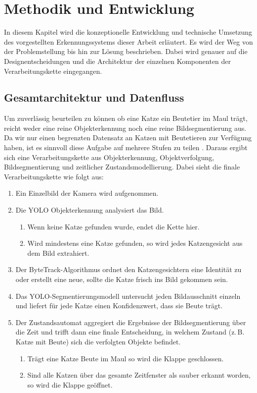 \chapter{Methodik und Entwicklung}
\label{sec:methodik}

In diesem Kapitel wird die konzeptionelle Entwicklung und technische Umsetzung des vorgestellten Erkennungssystems dieser Arbeit erläutert. Es wird der Weg von der Problemstellung bis hin zur Lösung beschrieben. Dabei wird genauer auf die Designentscheidungen und die Architektur der einzelnen Komponenten der Verarbeitungskette eingegangen.

\section{Gesamtarchitektur und Datenfluss}
Um zuverlässig beurteilen zu können ob eine Katze ein Beutetier im Maul trägt, reicht weder eine reine Objekterkennung noch eine reine Bildsegmentierung aus. Da wir nur einen begrenzten Datensatz an Katzen mit Beutetieren zur Verfügung haben, ist es sinnvoll diese Aufgabe auf mehrere Stufen zu teilen \cite{baumann2020smartcatflap}. Daraus ergibt sich eine Verarbeitungskette aus Objekterkennung, Objektverfolgung, Bildsegmentierung und zeitlicher Zustandsmodellierung. Dabei sieht die finale Verarbeitungskette wie folgt aus:

\begin{enumerate}
	\item Ein Einzelbild der Kamera wird aufgenommen.
	\item Die YOLO Objekterkennung analysiert das Bild.
	\begin{enumerate}
		\item Wenn keine Katze gefunden wurde, endet die Kette hier.
		\item Wird mindestens eine Katze gefunden, so wird jedes Katzengesicht aus dem Bild extrahiert.
	\end{enumerate}
	\item Der ByteTrack-Algorithmus ordnet den Katzengesichtern eine Identität zu oder erstellt eine neue, sollte die Katze frisch ins Bild gekommen sein.
	\item Das YOLO-Segmentierungsmodell untersucht jeden Bildausschnitt einzeln und liefert für jede Katze einen Konfidenzwert, dass sie Beute trägt.
	\item Der Zustandsautomat aggregiert die Ergebnisse der Bildsegmentierung über die Zeit und trifft dann eine finale Entscheidung, in welchem Zustand (z.\,B. \glqq Katze mit Beute\grqq) sich die verfolgten Objekte befindet.
	\begin{enumerate}
		\item Trägt eine Katze Beute im Maul so wird die Klappe geschlossen.
		\item Sind alle Katzen über das gesamte Zeitfenster als sauber erkannt worden, so wird die Klappe geöffnet.
	\end{enumerate}
\end{enumerate}

